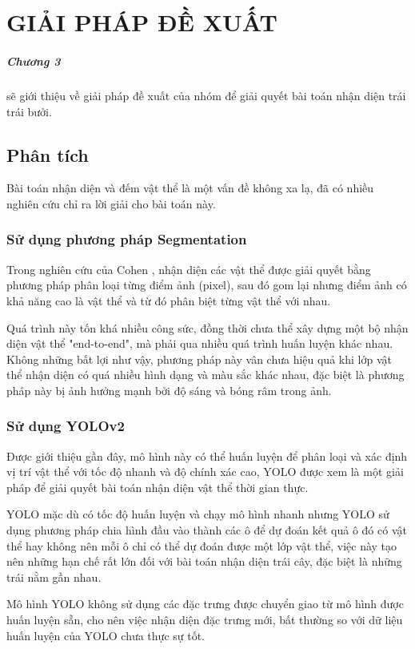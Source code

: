 \chapter{GIẢI PHÁP ĐỀ XUẤT}
\label{chap:caseFarming}
\paragraph{Chương 3} sẽ giới thiệu về giải pháp đề xuất của nhóm để giải quyết bài toán nhận diện trái trái bưởi.


\section{Phân tích}
Bài toán nhận diện và đếm vật thể là một vấn đề không xa lạ, đã có nhiều nghiên cứu chỉ ra lời giải cho bài toán này.
\subsection{Sử dụng phương pháp Segmentation}
Trong nghiên cứu của Cohen \cite{cohen2010estimation}, nhận diện các vật thể được giải quyết bằng phương pháp phân loại từng điểm ảnh (pixel), sau đó gom lại nhưng điểm ảnh có khả năng cao là vật thể và từ đó phân biệt từng vật thể với nhau.

Quá trình này tốn khá nhiều công sức, đồng thời chưa thể xây dựng một bộ nhận diện vật thể "end-to-end", mà phải qua nhiều quá trình huấn luyện khác nhau. Không những bất lợi như vậy, phương pháp này vân chưa hiệu quả khi lớp vật thể nhận diện có quá nhiều hình dạng và màu sắc khác nhau, đặc biệt là phương pháp này bị ảnh hưởng mạnh bởi độ sáng và bóng râm trong ảnh.

\subsection{Sử dụng YOLOv2}
Được giới thiệu gần đây, mô hình này có thể huấn luyện để phân loại và xác định vị trí vật thể với tốc độ nhanh và độ chính xác cao, YOLO được xem là một giải pháp để giải quyết bài toán nhận diện vật thể thời gian thực.

YOLO mặc dù có tốc độ huấn luyện và chạy mô hình nhanh nhưng YOLO sử dụng phương pháp chia hình đầu vào thành các ô để dự đoán kết quả ô đó có vật thể hay không nên mỗi ô chỉ có thể dự đoán được một lớp vật thể, việc này tạo nên những hạn chế rất lớn đối với bài toán nhận diện trái cây, đặc biệt là những trái nằm gần nhau.

Mô hình YOLO không sử dụng các đặc trưng được chuyển giao từ mô hình được huấn luyện sẵn, cho nên việc nhận diện đặc trưng mới, bất thường so với dữ liệu huấn luyện của YOLO chưa thực sự tốt.

